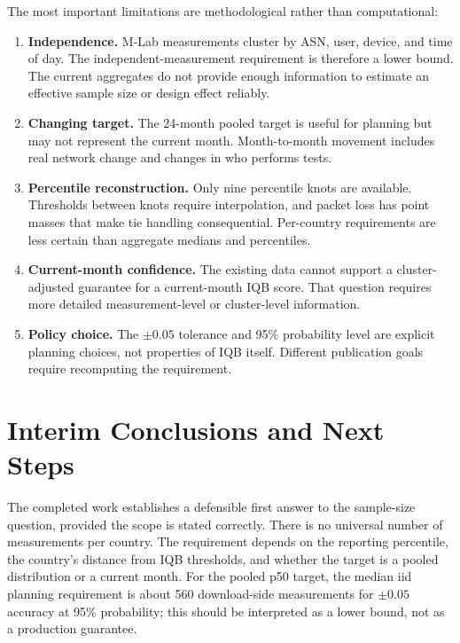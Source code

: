 \documentclass[11pt]{article}
\begin{document}
The most important limitations are methodological rather than computational:
\begin{enumerate}
  \item \textbf{Independence.} M-Lab measurements cluster by ASN, user, device, and time of day.
  The independent-measurement requirement is therefore a lower bound. The current aggregates do
  not provide enough information to estimate an effective sample size or design effect reliably.
  \item \textbf{Changing target.} The 24-month pooled target is useful for planning but may not
  represent the current month. Month-to-month movement includes real network change and changes in
  who performs tests.
  \item \textbf{Percentile reconstruction.} Only nine percentile knots are available. Thresholds
  between knots require interpolation, and packet loss has point masses that make tie handling
  consequential. Per-country requirements are less certain than aggregate medians and percentiles.
  \item \textbf{Current-month confidence.} The existing data cannot support a cluster-adjusted
  guarantee for a current-month IQB score. That question requires more detailed measurement-level
  or cluster-level information.
  \item \textbf{Policy choice.} The $\pm0.05$ tolerance and 95\% probability level are explicit
  planning choices, not properties of IQB itself. Different publication goals require recomputing
  the requirement.
\end{enumerate}

\section{Interim Conclusions and Next Steps}

The completed work establishes a defensible first answer to the sample-size question, provided the
scope is stated correctly. There is no universal number of measurements per country. The requirement
depends on the reporting percentile, the country's distance from IQB thresholds, and whether the
target is a pooled distribution or a current month. For the pooled p50 target, the median iid
planning requirement is about 560 download-side measurements for $\pm0.05$ accuracy at 95\%
probability; this should be interpreted as a lower bound, not as a production guarantee.
\end{document}
